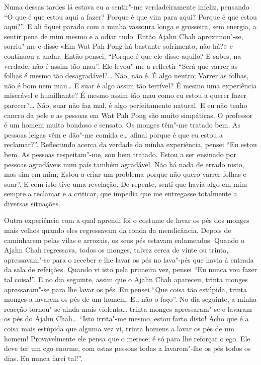 Numa dessas tardes lá estava eu a sentir"-me verdadeiramente infeliz, pensando “O
que é que estou aqui a fazer? Porque é que vim para aqui? Porque é que estou
aqui?”. E ali fiquei parado com a minha vassoura longa e grosseira, sem energia, 
a sentir pena de mim mesmo e a odiar tudo. Então Ajahn Chah
aproximou"-se, sorriu"-me e disse «Em Wat Pah Pong há bastante sofrimento, não
há?» e continuou a andar. Então pensei, “Porque é que ele disse aquilo? E sabes,
na verdade, não é assim tão mau”. Ele levou"-me a reflectir “Será que varrer as
folhas é mesmo tão desagradável?\ldots{} Não, não é. É algo neutro;
Varrer as folhas, não é bom nem mau\ldots{} E suar é algo assim tão terrível? É
mesmo uma experiência miserável e humilhante? É mesmo assim tão mau como eu
estou a querer fazer parecer?\ldots{} Não, suar não faz mal, é algo
perfeitamente natural. E eu não tenho cancro da pele e as pessoas em Wat Pah
Pong são muito simpáticas. O professor é um homem muito bondoso e sensato. Os
monges têm"-me tratado bem. As pessoas leigas vêm e dão"-me comida e\ldots{}
afinal porque é que eu estou a reclamar?”. Reflectindo acerca da verdade da
minha experiência, pensei “Eu estou bem. As pessoas respeitam"-me, sou bem
tratado. Estou a ser ensinado por pessoas agradáveis num país também agradável.
Não há nada de errado nisto, mas sim em mim; Estou a criar um problema porque não
quero varrer folhas e suar”. E com isto tive uma revelação. De repente, senti
que havia algo em mim sempre a reclamar e a criticar, que impedia que me
entregasse totalmente a diversas situações.

Outra experiência com a qual aprendi foi o costume de lavar os pés dos monges
mais velhos quando eles regressavam da ronda da mendicância. Depois de
caminharem pelas vilas e arrozais, os seus pés estavam enlameados. Quando o
Ajahn Chah regressava, todos os monges, talvez cerca de vinte ou trinta,
apressavam"-se para o receber e lhe lavar os pés no lava"-pés que havia à entrada
da sala de refeições. Quando vi isto pela primeira vez, pensei “Eu nunca vou
fazer tal coisa!”. E no dia seguinte, assim que o Ajahn Chah apareceu, trinta
monges apressaram"-se para lhe lavar os pés. Eu pensei “Que coisa tão estúpida,
trinta monges a lavarem os pés de um homem. Eu não o faço”. No dia seguinte, a
minha reacção tornou"-se ainda mais violenta\ldots{} trinta monges apressaram"-se e
lavaram os pés do Ajahn Chah\ldots{} “Isto irrita"-me mesmo, estou farto disto! Acho
que é a coisa mais estúpida que alguma vez vi, trinta homens a lavar os pés de
um homem! Provavelmente ele pensa que o merece; é só para lhe reforçar o ego.
Ele deve ter um ego enorme, com estas pessoas todas a lavarem"-lhe os pés todos
os dias. Eu nunca farei tal!”.

